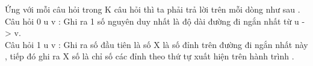 Ứng với mỗi câu hỏi trong K câu hỏi thì ta phải trả lời trên mỗi dòng như sau .   
\\   Câu hỏi 0 u v : Ghi ra 1 số nguyên duy nhất là độ dài đường đi ngắn nhất từ u -> v.   
\\   Câu hỏi 1 u v : Ghi ra số đầu tiên là số X là số đỉnh trên đường đi ngắn nhất này , tiếp đó ghi ra X số là chỉ số các đỉnh theo thứ tự xuất hiện trên hành trình .   
\\